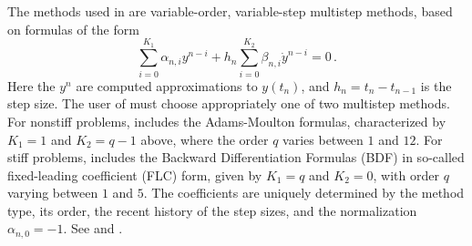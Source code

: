 The methods used in {\cvodes} are variable-order, variable-step multistep
methods, based on formulas of the form
\begin{equation}\label{e:lmm}
 \sum_{i = 0}^{K_1} \alpha_{n,i} y^{n-i} +
     h_n \sum_{i = 0}^{K_2} \beta_{n,i} {\dot{y}}^{n-i} = 0 \, .
\end{equation}
Here the $y^n$ are computed approximations to $y(t_n)$, and
$h_n = t_n - t_{n-1}$ is the step size.  The user of {\cvode} must choose
appropriately one of two multistep methods.  For nonstiff problems,
{\cvode} includes the Adams-Moulton formulas,
characterized by $K_1 = 1$
and $K_2 = q-1$ above, where the order $q$ varies between $1$ and $12$.
For stiff problems, {\cvodes} includes the Backward Differentiation
Formulas (BDF)  
in so-called fixed-leading coefficient (FLC) form, given by
$K_1 = q$ and $K_2 = 0$, with order $q$ varying between $1$ and $5$.
The coefficients are uniquely determined by the method type, its
order, the recent history of the step sizes, and the normalization
$\alpha_{n,0} = -1$.  See \cite{ByHi:75} and \cite{JaSD:80}.

